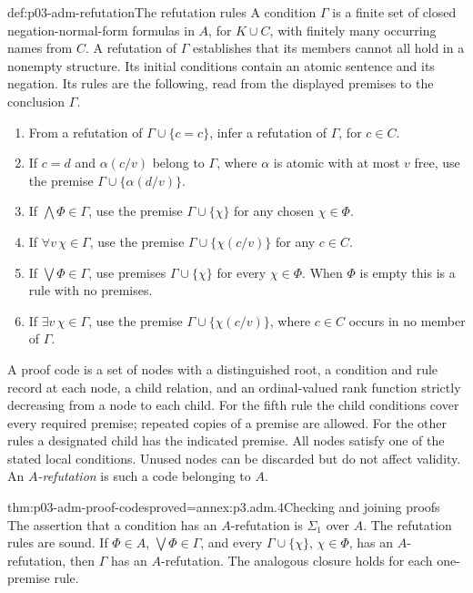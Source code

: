 \begin{hbdefinition}{def:p03-adm-refutation}{The refutation rules}
A condition \(\Gamma\) is a finite set of closed negation-normal-form
formulas in \(A\), for \(K\cup C\), with finitely many occurring names
from \(C\). A refutation of \(\Gamma\) establishes that its members
cannot all hold in a nonempty structure. Its initial conditions contain
an atomic sentence and its negation. Its rules are the following,
read from the displayed premises to the conclusion \(\Gamma\).
\begin{enumerate}
\item From a refutation of \(\Gamma\cup\{c=c\}\), infer a refutation
      of \(\Gamma\), for \(c\in C\).
\item If \(c=d\) and \(\alpha(c/v)\) belong to \(\Gamma\), where
      \(\alpha\) is atomic with at most \(v\) free, use the premise
      \(\Gamma\cup\{\alpha(d/v)\}\).
\item If \(\bigwedge\Phi\in\Gamma\), use the premise
      \(\Gamma\cup\{\chi\}\) for any chosen \(\chi\in\Phi\).
\item If \(\forall v\,\chi\in\Gamma\), use the premise
      \(\Gamma\cup\{\chi(c/v)\}\) for any \(c\in C\).
\item If \(\bigvee\Phi\in\Gamma\), use premises
      \(\Gamma\cup\{\chi\}\) for every \(\chi\in\Phi\).
      When \(\Phi\) is empty this is a rule with no premises.
\item If \(\exists v\,\chi\in\Gamma\), use the premise
      \(\Gamma\cup\{\chi(c/v)\}\), where \(c\in C\) occurs in no
      member of \(\Gamma\).
\end{enumerate}
A proof code is a set of nodes with a distinguished root, a condition
and rule record at each node, a child relation, and an ordinal-valued
rank function strictly decreasing from a node to each child. For the
fifth rule the child conditions cover every required premise; repeated
copies of a premise are allowed. For the other rules a designated child
has the indicated premise. All nodes satisfy one of the stated local
conditions. Unused nodes can be discarded but do not affect validity.
An \emph{\(A\)-refutation} is such a code belonging to \(A\).
\end{hbdefinition}

\begin{hblemma}{thm:p03-adm-proof-codes}{proved=annex:p3.adm.4}{Checking and joining proofs}
The assertion that a condition has an \(A\)-refutation is
\(\Sigma_1\) over \(A\). The refutation rules are sound. If
\(\Phi\in A\), \(\bigvee\Phi\in\Gamma\), and every
\(\Gamma\cup\{\chi\}\), \(\chi\in\Phi\), has an \(A\)-refutation,
then \(\Gamma\) has an \(A\)-refutation. The analogous closure holds
for each one-premise rule.
\end{hblemma}

